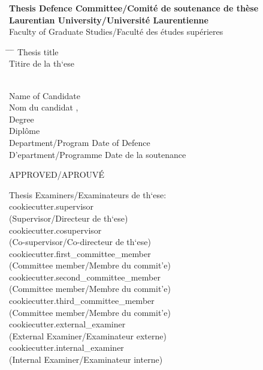 \begin{center}
    \textbf{Thesis Defence Committee/Comit\'e de soutenance de th\`ese} \\
    \textbf{Laurentian University/Universit\'e Laurentienne} \\
    Faculty of Graduate Studies/Facult\'e des \'etudes sup\'erieres
\end{center}
\footnotesize
\begin{tabbing}
    \hspace{0.25\textwidth} \= \hspace{0.33\textwidth} \= \hspace{0.22\textwidth} \= \hspace{0.2\textwidth} \kill
    Thesis title \\
    Titire de la th\a`ese \> \begin{minipage}[t]{0.75\textwidth} \thetitle \end{minipage} \\[1.0em]
    Name of Candidate \\
    Nom du candidat \> \surname , \givenname \\[1.0em]
    Degree \\
    Dipl\^ome \> \programdegree \\[1.0em]
    Department/Program \> \> Date of Defence \\
    D\a'epartment/Programme \> \program \> Date de la soutenance \> \dateofdefence
\end{tabbing}
\vspace{-\parskip}
\begin{center}
    \normalsize
    APPROVED/APROUV\'E \\
\end{center}
\vspace{-\parskip}
\begin{minipage}[c]{0.5\textwidth}
    Thesis Examiners/Examinateurs de th\a`ese: \\[1.0em]
    {{cookiecutter.supervisor}} \\
    (Supervisor/Directeur de th\a`ese) \\[0.5em]
    {{cookiecutter.cosupervisor}} \\
    (Co-supervisor/Co-directeur de th\a`ese) \\[0.5em]
    {{cookiecutter.first_committee_member}} \\
    (Committee member/Membre du commit\a'e) \\[0.5em]
    {{cookiecutter.second_committee_member}} \\
    (Committee member/Membre du commit\a'e) \\[0.5em]
    {{cookiecutter.third_committee_member}} \\
    (Committee member/Membre du commit\a'e) \\[0.5em]
    {{cookiecutter.external_examiner}} \\
    (External Examiner/Examinateur externe) \\[0.5em]
    {{cookiecutter.internal_examiner}} \\
    (Internal Examiner/Examinateur interne) \\[0.5em]
\end{minipage}
